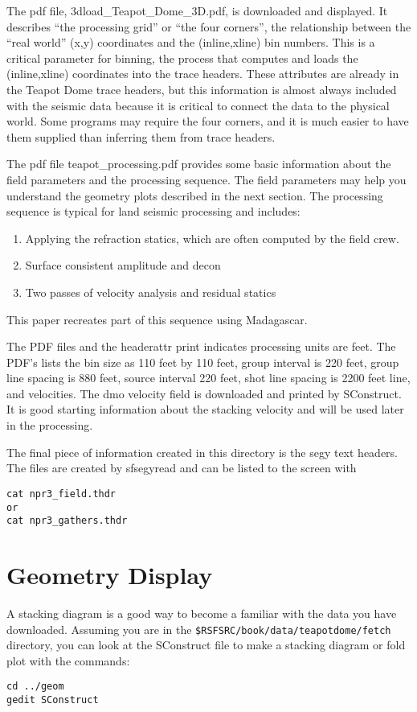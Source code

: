 The pdf file, 3dload\_Teapot\_Dome\_3D.pdf, is downloaded and displayed.  It describes “the processing grid” or “the four corners”, the relationship between the “real world” (x,y) coordinates and the (inline,xline) bin numbers.  This is a critical parameter for binning, the process that computes and loads the (inline,xline) coordinates into the trace headers.  These attributes are already in the Teapot Dome trace headers, but this information is almost always included with the seismic data because it is critical to connect the data to the physical world.  Some programs may require the four corners, and it is much easier to have them supplied than inferring them from trace headers.

The pdf file teapot\_processing.pdf provides some basic information about the field parameters and the processing sequence.  The field parameters may help you understand the geometry plots described in the next section.  The processing sequence is typical for land seismic processing and includes:
\begin{enumerate}
\item Applying the refraction statics, which are often computed by the field crew.
\item Surface consistent amplitude and decon
\item Two passes of velocity analysis and residual statics
\end{enumerate}

This paper recreates part of this sequence using Madagascar.

The PDF files and the headerattr print indicates processing units are feet.  The PDF’s lists the bin size as 110 feet by 110 feet, group interval is 220 feet, group line spacing is 880 feet, source interval 220 feet, shot line spacing is 2200 feet line, and velocities. The dmo velocity field is downloaded and printed by SConstruct.  It is good starting information about the stacking velocity and will be used later in the processing.

The final piece of information created in this directory is the segy text headers.   The files are created by sfsegyread and can be listed to the screen with 
\begin{verbatim}
cat npr3_field.thdr 
or 
cat npr3_gathers.thdr
\end{verbatim}

\section{Geometry Display}
A stacking diagram is a good way to become a familiar with the data you have downloaded.  Assuming you are in the \texttt{\$RSFSRC/book/data/teapotdome/fetch} directory, you can look at the SConstruct file to make a stacking diagram or fold plot with the commands:
\begin{verbatim}  
cd ../geom
gedit SConstruct
\end{verbatim}  

